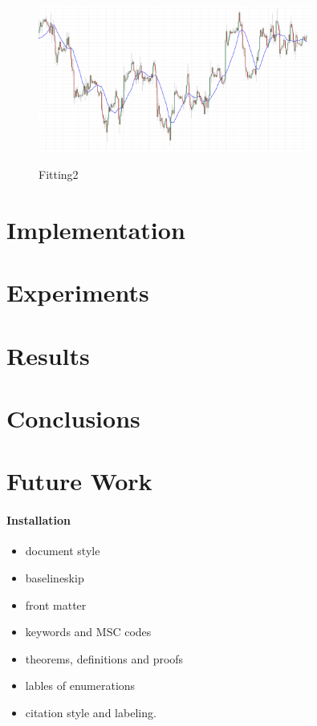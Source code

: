 \documentclass[review]{elsarticle}
\begin{document}
\begin{figure}
\caption{Fitting2}
\centering
\includegraphics[width=0.8\textwidth]{img/fitting2.png}
\label{figure:fitting2}
\end{figure}

\section{Implementation}
\label{section:implementation}

\section{Experiments}
\label{section:experiments}

\section{Results}
\label{section:results}

\section{Conclusions}
\label{section:conclusions}

\section{Future Work}
\label{section:future-work}


\paragraph{Installation}

\begin{itemize}
\item document style
\item baselineskip
\item front matter
\item keywords and MSC codes
\item theorems, definitions and proofs
\item lables of enumerations
\item citation style and labeling.
\end{itemize}
\end{document}
